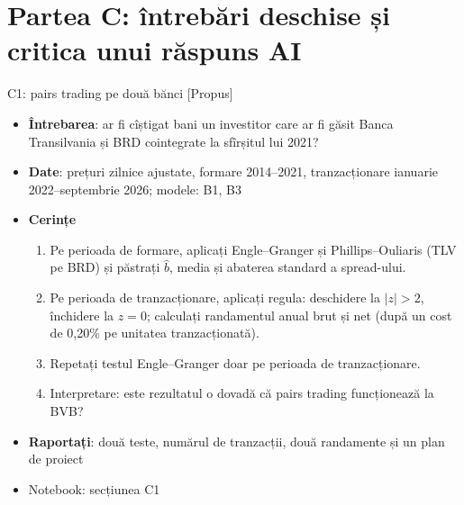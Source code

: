 \section{Partea C: întrebări deschise și critica unui răspuns AI}

\begin{frame}{C1: pairs trading pe două bănci [Propus]}
\itemsize{\footnotesize}
\begin{itemize}
\item \textbf{Întrebarea}: ar fi cîștigat bani un investitor care ar fi găsit Banca Transilvania și BRD cointegrate la sfîrșitul lui 2021?
\item \textbf{Date}: prețuri zilnice ajustate, formare 2014--2021, tranzacționare ianuarie 2022--septembrie 2026; modele: B1, B3
\item \textbf{Cerințe}
\begin{enumerate}
    \item Pe perioada de formare, aplicați Engle--Granger și Phillips--Ouliaris (TLV pe BRD) și păstrați $\hat b$, media și abaterea standard a spread-ului.
    \item Pe perioada de tranzacționare, aplicați regula: deschidere la $|z| > 2$, închidere la $z = 0$; calculați randamentul anual brut și net (după un cost de 0,20\% pe unitatea tranzacționată).
    \item Repetați testul Engle--Granger doar pe perioada de tranzacționare.
    \item Interpretare: este rezultatul o dovadă că pairs trading funcționează la BVB?
\end{enumerate}
\item \textbf{Raportați}: două teste, numărul de tranzacții, două randamente și un plan de proiect
\item Notebook: secțiunea C1
\end{itemize}
\end{frame}

